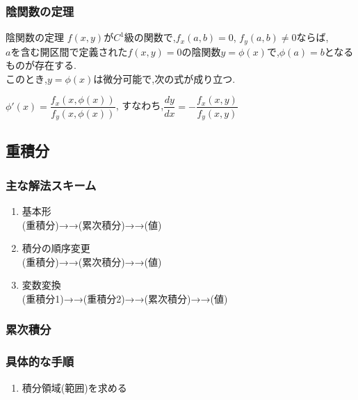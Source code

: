 \documentclass[a4paper]{jsarticle}
\begin{document}
\subsubsection{陰関数の定理}
\begin{itembox}[l]{陰関数の定理}
    $f\left(x,y\right)$が$C^1$級の関数で,$f_x\left(a,b\right)=0$, $f_y\left(a,b\right)\neq0$ならば,\\
    $a$を含む開区間で定義された$f(x,y)=0$の陰関数$y=\phi\left(x\right)$で,$\phi\left(a\right)=b$となるものが存在する.\\
    このとき,$y=\phi\left(x\right)$は微分可能で,次の式が成り立つ.
    \begin{center}
        $\phi'\left(x\right)=\dfrac{f_x\left(x,\phi\left(x\right)\right)}{f_y\left(x,\phi\left(x\right)\right)}$,
        \quad すなわち,\quad$\dfrac{dy}{dx}=-\dfrac{f_x\left(x,y\right)}{f_y\left(x,y\right)}$
    \end{center}
\end{itembox}
\subsection{重積分}
\subsubsection{主な解法スキーム}
\begin{enumerate}[(1)]
    \item 基本形\\
          (重積分)→→(累次積分)→→(値)
    \item 積分の順序変更\\
          (重積分)→→(累次積分)→→(値)
    \item 変数変換\\
          (重積分1)→→(重積分2)→→(累次積分)→→(値)
\end{enumerate}
\subsubsection{累次積分}
\subsubsection{具体的な手順}
\begin{enumerate}[(1)]
    \item 積分領域(範囲)を求める
\end{enumerate}
\end{document}

